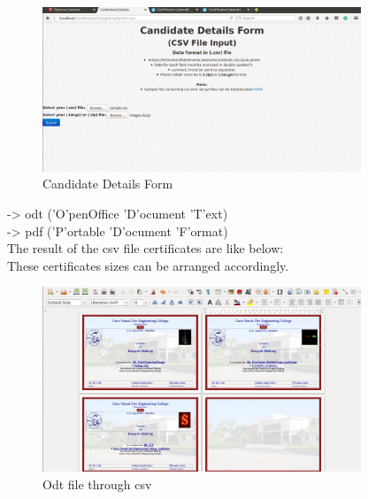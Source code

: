 \begin{figure}[!ht]
\centering
\includegraphics[width=0.85\textwidth]{images/cgs/cgs9.png}                 
\caption{Candidate Details Form}
\hspace{-1.5em}
\end{figure}
-> odt ('O'penOffice 'D'ocument 'T'ext)\\
-> pdf ('P'ortable 'D'ocument 'F'ormat)\\
The result of the csv file certificates are like below:\\
These certificates sizes can be arranged accordingly.\\

\begin{figure}[ht!]
\centering
\includegraphics[width=0.85\textwidth]{images/cgs/cgs14.png}                  
\caption{Odt file through csv}
\hspace{-1.5em}
\end{figure}




